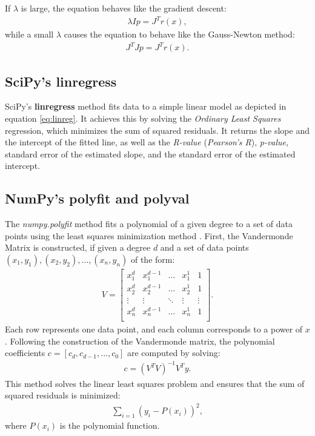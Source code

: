 If $\lambda$ is large, the equation behaves like the gradient descent:
\begin{align}
    \lambda I p= J^{T}r(x),
\end{align}
while a small $\lambda$ causes the equation to behave like the Gauss-Newton method:
\begin{align}
    J^{T}Jp=J^{T}r(x).
\end{align}
\cite{gavin2020levenberg} \cite{Levenberg-Marquardt} \cite{broxOptimierung}

\subsection{SciPy's linregress}\label{subsec:linreg}
SciPy's \textbf{linregress} method fits data to a simple linear model as depicted in equation \ref{eq:linreg}. It achieves this by solving the \textit{Ordinary Least Squares} regression, which minimizes the sum of squared residuals. It returns the slope and the intercept of the fitted line, as well as the \textit{R-value} (\textit{Pearson's R}), \textit{p-value}, standard error of the estimated slope, and the standard error of the estimated intercept.
\cite{SciPyLinRegress} \cite{Wooditch2021}

\subsection{NumPy's polyfit and polyval}\label{subsec:polyfit}
The \textit{numpy.polyfit} method fits a polynomial of a given degree to a set of data points using the least squares minimization method \cite{NumPyPolyfit}. First, the Vandermonde Matrix is constructed, if given a degree $d$ and a set of data points $(x_1, y_1), (x_2, y_2), \dots, (x_n, y_n)$ of the form:
\begin{align}
    V =
    \begin{bmatrix} 
        x_{1}^{d} & x_{1}^{d-1} & \dots & x_{1}^{1} & 1 \\
        x_{2}^{d} & x_{2}^{d-1} & \dots & x_{2}^{1} & 1 \\
        \vdots & \vdots & \ddots & \vdots & \vdots \\
        x_{n}^{d} & x_{n}^{d-1} & \dots & x_{n}^{1} & 1 \\ 
    \end{bmatrix}.
\end{align}
Each row represents one data point, and each column corresponds to a power of $x$. Following the construction of the Vandermonde matrix, the polynomial coefficients $c=[c_{d},c_{d-1},...,c_{0}]$ are computed by solving:
\begin{align}
    c=(V^{T}V)^{-1}V^{T}y.
\end{align}
This method solves the linear least squares problem and ensures that the sum of squared residuals is minimized:
\begin{align}
    \sum_{i=1}{(y_{i}-P(x_i))^{2}},
\end{align}
where $P(x_{i})$ is the polynomial function. \cite{NumPyPolyfit} \cite{Vandermonde} \cite{GATechLS}


